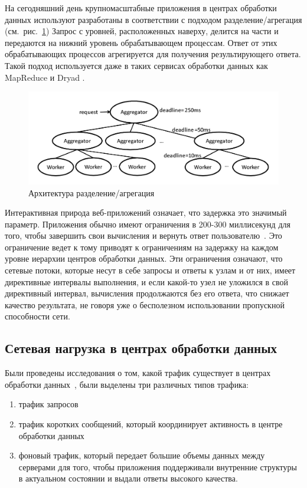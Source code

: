 \documentclass[14pt, a4paper,oneside]{extarticle}
\begin{document}
На сегодняшний день крупномасштабные приложения в центрах обработки данных используют разработаны в соответствии с подходом разделение/агрегация (см.~рис.~\ref{dc_arch})
Запрос с уровней, расположенных наверху, делится на части и передаются на нижний уровень обрабатывающем процессам. Ответ от этих обрабатывающих процессов агрегируется для получения результирующего ответа. Такой подход используется даже в таких сервисах обработки данных как MapReduce и  Dryad . %
\begin{figure}[h]
	\includegraphics[width=0.7\linewidth]{datacenter_arch}
	\caption{Архитектура разделение/агрегация}
	\label{dc_arch}
\end{figure}

Интерактивная природа веб-приложений означает, что задержка это значимый параметр. Приложения обычно имеют ограничения в 200-300 миллисекунд для того, чтобы завершить свои вычисления и вернуть ответ пользователю~\cite{sla}. Это ограничение ведет к тому приводят к ограничениям на задержку на каждом уровне иерархии центров обработки данных. Эти ограничения означают, что сетевые потоки, которые несут в себе запросы и ответы к узлам и от них, имеет директивные интервалы выполнения, и если какой-то узел не уложился в свой директивный интервал, вычисления продолжаются без его ответа, что снижает качество результата, не говоря уже о бесполезном использовании пропускной способности сети.

\subsection{Сетевая нагрузка в центрах обработки данных}
Были проведены исследования о том, какой трафик существует в центрах обработки данных~\cite{dctcp}, были выделены три различных типов трафика:
\begin{enumerate}
\item трафик запросов
\item трафик коротких сообщений, который координирует активность в центре обработки данных
\item фоновый трафик, который передает большие объемы данных между серверами для того, чтобы приложения поддерживали внутренние структуры в актуальном состоянии и выдали ответы высокого качества.
\end{enumerate}
\end{document}
